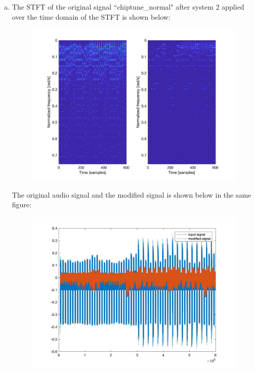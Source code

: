 \documentclass[a4paper]{article}
\begin{document}
\begin{spacing}{2.0}
\begin{enumerate}[(a)]
\item The STFT of the original signal ``chiptune\_normal" after system 2 applied over the time domain of the STFT is shown below:
\begin{figure}[H]
\centering
\includegraphics[width=5in]{3b.jpg}
\label{fig:graph}
\end{figure}
The original audio signal and the modified signal is shown below in the same figure:
\begin{figure}[H]
\centering
\includegraphics[width=5in]{3b_audio.jpg}
\label{fig:graph}
\end{figure}


\end{enumerate}
\end{spacing}
\end{document}
